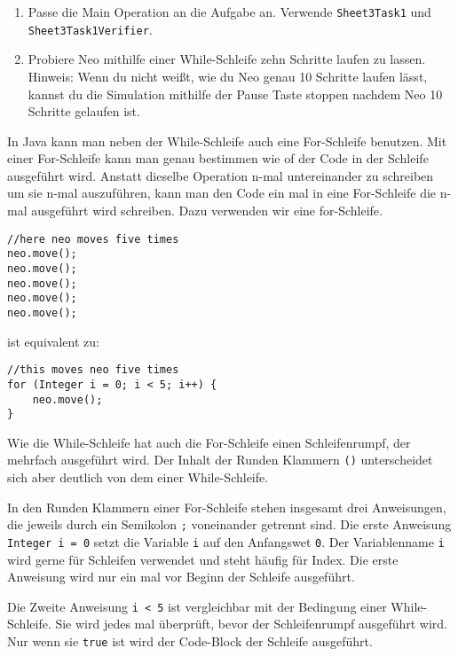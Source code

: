 
\begin{enumerate}
	\item Passe die Main Operation an die Aufgabe an. 
		Verwende \lstinline{Sheet3Task1} und \lstinline{Sheet3Task1Verifier}.
	\item Probiere Neo mithilfe einer While-Schleife zehn Schritte laufen zu lassen.\\
	
		Hinweis: Wenn du nicht weißt, wie du Neo genau 10 Schritte laufen lässt, kannst du die Simulation mithilfe der Pause Taste stoppen nachdem Neo 10 Schritte gelaufen ist.
\end{enumerate}


\begin{Infobox}
	In Java kann man neben der While-Schleife auch eine For-Schleife benutzen.
	Mit einer For-Schleife kann man genau bestimmen wie of der Code in der Schleife ausgeführt wird.
	Anstatt dieselbe Operation n-mal untereinander zu schreiben um sie n-mal auszuführen, kann man den Code ein mal in eine For-Schleife die n-mal ausgeführt wird schreiben.
	Dazu verwenden wir eine for-Schleife. 

	\begin{lstlisting}[numbers=none]
//here neo moves five times
neo.move();
neo.move();
neo.move();
neo.move();
neo.move();
	\end{lstlisting}
	
	ist equivalent zu:

	\begin{lstlisting}[numbers=none]
//this moves neo five times
for (Integer i = 0; i < 5; i++) {
	neo.move();
}
	\end{lstlisting}

	Wie die While-Schleife hat auch die For-Schleife einen Schleifenrumpf, der mehrfach ausgeführt wird.
	Der Inhalt der Runden Klammern \lstinline{()} unterscheidet sich aber deutlich von dem einer While-Schleife.

	In den Runden Klammern einer For-Schleife stehen insgesamt drei Anweisungen, die jeweils durch ein Semikolon \lstinline{;} voneinander getrennt sind.
	Die erste Anweisung \lstinline{Integer i = 0} setzt die Variable \lstinline{i} auf den Anfangswet \lstinline{0}.
	Der Variablenname \lstinline{i} wird gerne für Schleifen verwendet und steht häufig für Index.
	Die erste Anweisung wird nur ein mal vor Beginn der Schleife ausgeführt.
	
	Die Zweite Anweisung \lstinline{i < 5} ist vergleichbar mit der Bedingung einer While-Schleife.
	Sie wird jedes mal überprüft, bevor der Schleifenrumpf ausgeführt wird.
	Nur wenn sie \lstinline{true} ist wird der Code-Block der Schleife ausgeführt.


\end{Infobox}
